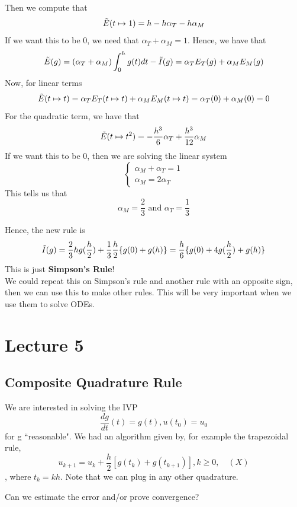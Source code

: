 \documentclass{article}
\begin{document}
Then we compute that
\[\Tilde{E}(t \mapsto 1) = h - h \alpha_T - h \alpha_M \]
If we want this to be $0$, we need that $\alpha_T + \alpha_M = 1$. Hence, we have that
\[\Tilde{E}(g) = (\alpha_T + \alpha_M) \int_0^h g(t) dt - \Tilde{I}(g) = \alpha_T E_T(g) + \alpha_M E_M(g) \]
Now, for linear terms
\[\Tilde{E}(t \mapsto t) = \alpha_T E_T(t \mapsto t) + \alpha_M E_M(t \mapsto t) = \alpha_T(0) + \alpha_M(0) = 0\]
For the quadratic term, we have that
\[\Tilde{E}(t \mapsto t^2) = -\frac{h^3}{6} \alpha_T + \frac{h^3}{12} \alpha_M\]
If we want this to be $0$, then we are solving the linear system
\[\begin{cases}
    \alpha_M + \alpha_T = 1\\
    \alpha_M = 2\alpha_T
\end{cases}\]
This tells us that
\[\alpha_M = \frac{2}{3} \text{ and } \alpha_T = \frac{1}{3}\]

Hence, the new rule is
\[\Tilde{I}(g) = \frac{2}{3} h g(\frac{h}{2}) + \frac{1}{3} \frac{h}{2} \{g(0) + g(h)\} = \frac{h}{6} \{g(0) + 4 g(\frac{h}{2}) + g(h)\}\]
This is just \textbf{Simpson's Rule}!\\

We could repeat this on Simpson's rule and another rule with an opposite sign, then we can use this to make other rules. This will be very important when we use them to solve ODEs.

\newpage
\section{Lecture 5}

\subsection{Composite Quadrature Rule}

We are interested in solving the IVP
\[\frac{dg}{dt}(t) = g(t), u(t_0) = u_0\]
for g ``reasonable". We had an algorithm given by, for example the trapezoidal rule,
\[u_{k+1} = u_k + \frac{h}{2} [g(t_k) + g(t_{k+1})], k \geq 0, \quad (X)\]
, where $t_k = kh$. Note that we can plug in any other quadrature.

\begin{question}
    Can we estimate the error and/or prove convergence?
\end{question}
\end{document}

